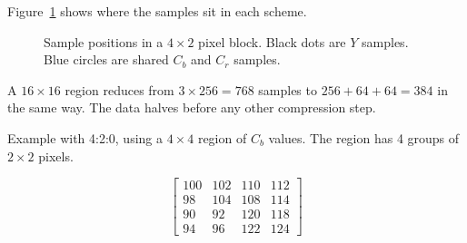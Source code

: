 \documentclass[11pt,a4paper]{article}
\begin{document}
Figure~\ref{fig:subsampling} shows where the samples sit in each scheme.

\newcommand{\pixgrid}[2]{%
  \draw[gray] (#1,0) grid (#1+4,2);
  \foreach \x in {0,...,3} \foreach \y in {0,1} \fill (#1+\x+0.5,\y+0.5) circle (0.07);
  \node at (#1+2,-0.5) {#2};}
\begin{figure}[h]
\centering
{}
\caption{Sample positions in a $4\times2$ pixel block. Black dots are $Y$ samples. Blue circles are shared $C_b$ and $C_r$ samples.}
\label{fig:subsampling}
\end{figure}

A $16\times16$ region reduces from $3\times256=768$ samples to $256+64+64=384$ in the same way. The data halves before any other compression step.

Example with 4:2:0, using a $4\times4$ region of $C_b$ values. The region has 4 groups of $2\times2$ pixels.

\[
\begin{bmatrix}
100&102&110&112\\
 98&104&108&114\\
 90& 92&120&118\\
 94& 96&122&124
\end{bmatrix}
\]
\end{document}
